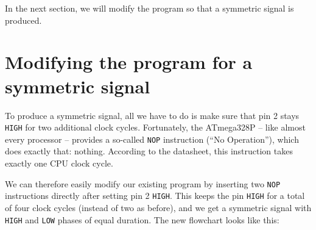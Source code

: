\documentclass[a4paper,12pt]{article}
\begin{document}
\noindent
In the next section, we will modify the program so that a symmetric signal
is produced.


\newpage

\section{Modifying the program for a symmetric signal}
\label{sec:Programmanpassung}

To produce a symmetric signal, all we have to do is make sure that pin 2
stays \texttt{HIGH} for two additional clock cycles.
Fortunately, the ATmega328P – like almost every processor – provides a
so-called \texttt{NOP} instruction (``No Operation''), which does exactly
that: nothing. According to the datasheet, this instruction takes exactly one
CPU clock cycle.

We can therefore easily modify our existing program by inserting two
\texttt{NOP} instructions directly after setting pin 2 \texttt{HIGH}. This
keeps the pin \texttt{HIGH} for a total of four clock cycles (instead of two
as before), and we get a symmetric signal with \texttt{HIGH} and
\texttt{LOW} phases of equal duration.
The new flowchart looks like this:

\begin{center}
\end{center}
\end{document}
